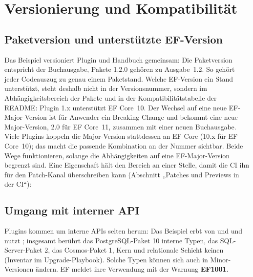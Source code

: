 \chapter{Versionierung und Kompatibilität}\label{ch:versioning-and-compatibility}

\section{Paketversion und unterstützte EF-Version}

Das Beispiel versioniert Plugin und Handbuch gemeinsam: Die Paketversion entspricht der
Buchausgabe, Pakete 1.2.0 gehören zu Ausgabe~1.2. So gehört jeder Codeauszug zu genau einem
Paketstand. Welche EF-Version ein Stand unterstützt, steht deshalb nicht in der Versionsnummer,
sondern im Abhängigkeitsbereich der Pakete und in der Kompatibilitätstabelle der README: Plugin
1.x unterstützt EF Core~10. Der Wechsel auf eine neue EF-Major-Version ist für Anwender ein
Breaking Change und bekommt eine neue Major-Version, 2.0 für EF Core~11, zusammen mit einer
neuen Buchausgabe. Viele Plugins koppeln die Major-Version stattdessen an EF Core (10.x für EF
Core~10); das macht die passende Kombination an der Nummer sichtbar. Beide Wege funktionieren,
solange die Abhängigkeiten auf eine EF-Major-Version begrenzt sind. Eine Eigenschaft hält den
Bereich an einer Stelle, damit die CI ihn für den Patch-Kanal überschreiben kann (Abschnitt
„Patches und Previews in der CI“):

\begin{sourcecode}[Directory.\allowbreak{}Packages.\allowbreak{}props (\allowbreak{}Auszug)]{xml}
<PropertyGroup>
  <EFCoreVersion Condition="'$(EFCoreVersion)' == ''">[10.0.0,11.0.0)</EFCoreVersion>
  <CentralPackageFloatingVersionsEnabled>true</CentralPackageFloatingVersionsEnabled>
</PropertyGroup>
<PackageVersion Include="Microsoft.EntityFrameworkCore" Version="$(EFCoreVersion)" />
<PackageVersion Include="Npgsql.EntityFrameworkCore.PostgreSQL" Version="$(EFCoreVersion)" />
\end{sourcecode}

\section{Umgang mit interner API}

Plugins kommen um interne APIs selten herum: Das Beispiel erbt von
 und
 und nutzt
; insgesamt berührt das
PostgreSQL-Paket 10 interne Typen, das SQL-Server-Paket 2, das Cosmos-Paket 1, Kern und
relationale Schicht keinen (Inventar im Upgrade-Playbook). Solche Typen können sich auch in Minor-Versionen ändern. EF meldet ihre
Verwendung mit der Warnung \textbf{EF1001}.


